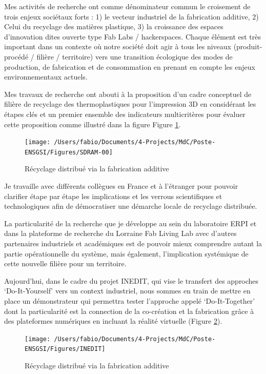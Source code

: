 \documentclass[
  12pt,
  oneside]{book}
\begin{document}
Mes activités de recherche ont comme dénominateur commun le croisement de trois enjeux sociétaux forts : 1) le vecteur industriel de la fabrication additive, 2) Celui du recyclage des matières plastique, 3) la croissance des espaces d'innovation dites ouverte type Fab Labs / hackerspaces. Chaque élément est très important dans un contexte où notre société doit agir à tous les niveaux (produit-procédé / filière / territoire) vers une transition écologique des modes de production, de fabrication et de consommation en prenant en compte les enjeux environnementaux actuels.

Mes travaux de recherche ont abouti à la proposition d'un cadre conceptuel de filière de recyclage des thermoplastiques pour l'impression 3D en considérant les étapes clés et un premier ensemble des indicateurs multicritères pour évaluer cette proposition comme illustré dans la figure Figure \ref{fig:DRAM}.

\begin{figure}

{\centering \texttt{[image: /Users/fabio/Documents/4-Projects/MdC/Poste-ENSGSI/Figures/SDRAM-00]} 

}

\caption{Récyclage distribué via la fabrication additive}\label{fig:DRAM}
\end{figure}

Je travaille avec différents collègues en France et à l'étranger pour pouvoir clarifier étape par étape les implications et les verrous scientifiques et technologiques afin de démocratiser une démarche locale de recyclage distribuée.

La particularité de la recherche que je développe au sein du laboratoire ERPI et dans la plateforme de recherche du Lorraine Fab Living Lab avec d'autres partenaires industriels et académiques est de pouvoir mieux comprendre autant la partie opérationnelle du système, mais également, l'implication systémique de cette nouvelle filière pour un territoire.

Aujourd'hui, dans le cadre du projet INEDIT, qui vise le transfert des approches `Do-It-Yourself' vers un context industriel, nous sommes en train de mettre en place un démonstrateur qui permettra tester l'approche appelé `Do-It-Together' dont la particularité est la connection de la co-création et la fabrication grâce à des plateformes numériques en incluant la réalité virtuelle (Figure \ref{fig:DRAM-INEDIT}).

\begin{figure}

{\centering \texttt{[image: /Users/fabio/Documents/4-Projects/MdC/Poste-ENSGSI/Figures/INEDIT]} 

}

\caption{Récyclage distribué via la fabrication additive}\label{fig:DRAM-INEDIT}
\end{figure}
\end{document}
